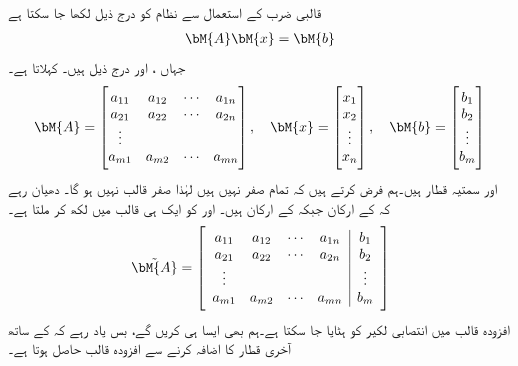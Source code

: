 قالبی ضرب کے استعمال سے نظام  کو درج ذیل لکھا جا سکتا ہے
\begin{align}
\bM{A}\bM{x}=\bM{b}
\end{align}
جہاں ،  اور  درج ذیل ہیں۔  کہلاتا ہے۔
\begin{align}
\bM{A}=\begin{bmatrix} a_{11}&a_{12}&\cdots &a_{1n}\\a_{21}&a_{22}&\cdots&a_{2n}\\\vdots\\a_{m1}&a_{m2}&\cdots&a_{mn} \end{bmatrix}, \quad \bM{x}=\begin{bmatrix}x_1\\x_2\\ \vdots \\x_n  \end{bmatrix}, \quad \bM{b}=\begin{bmatrix} b_1\\b_2\\ \vdots\\ b_m \end{bmatrix}
\end{align}
 اور  سمتیہ قطار ہیں۔ہم فرض کرتے ہیں کہ  تمام صفر نہیں ہیں لہٰذا  صفر قالب نہیں ہو گا۔  دھیان رہے کہ  کے  ارکان جبکہ  کے  ارکان ہیں۔ اور  کو ایک ہی قالب میں لکھ کر    ملتا ہے۔
\begin{align}
\tilde{\bM{A}}=\left[\begin{array}{cccc|c} a_{11}&a_{12}&\cdots &a_{1n}&b_1\\a_{21}&a_{22}&\cdots&a_{2n}&b_2\\ \vdots &&&&\vdots\\a_{m1}&a_{m2}&\cdots&a_{mn}&b_m \end{array}\right]
\end{align}
افزودہ قالب میں انتصابی لکیر کو ہٹایا جا سکتا ہے۔ہم بھی ایسا ہی کریں گے، بس یاد رہے کہ   کے ساتھ آخری قطار  کا اضافہ کرنے  سے افزودہ قالب  حاصل ہوتا ہے۔ 

